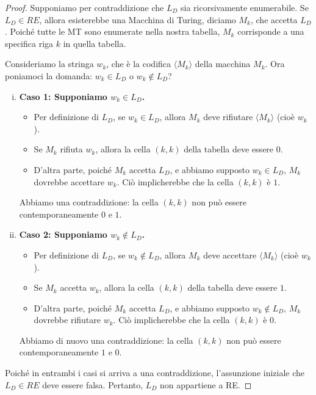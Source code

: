 \documentclass[a4paper, 11pt]{book} %
\theoremstyle{definition}
\begin{document}
\begin{proof}
Supponiamo per contraddizione che $L_D$ sia ricorsivamente enumerabile. Se $L_D \in RE$, allora esisterebbe una Macchina di Turing, diciamo $M_k$, che accetta $L_D$. Poiché tutte le MT sono enumerate nella nostra tabella, $M_k$ corrisponde a una specifica riga $k$ in quella tabella.

Consideriamo la stringa $w_k$, che è la codifica $\langle M_k \rangle$ della macchina $M_k$.
Ora poniamoci la domanda: $w_k \in L_D$ o $w_k \notin L_D$?

\begin{enumerate}[(i)]
    \item \textbf{Caso 1: Supponiamo $w_k \in L_D$.}
    \begin{itemize}
        \item Per definizione di $L_D$, se $w_k \in L_D$, allora $M_k$ deve rifiutare $\langle M_k \rangle$ (cioè $w_k$).
        \item Se $M_k$ rifiuta $w_k$, allora la cella $(k,k)$ della tabella deve essere $0$.
        \item D'altra parte, poiché $M_k$ accetta $L_D$, e abbiamo supposto $w_k \in L_D$, $M_k$ dovrebbe accettare $w_k$. Ciò implicherebbe che la cella $(k,k)$ è $1$.
    \end{itemize}
    Abbiamo una contraddizione: la cella $(k,k)$ non può essere contemporaneamente $0$ e $1$.

    \item \textbf{Caso 2: Supponiamo $w_k \notin L_D$.}
    \begin{itemize}
        \item Per definizione di $L_D$, se $w_k \notin L_D$, allora $M_k$ deve accettare $\langle M_k \rangle$ (cioè $w_k$).
        \item Se $M_k$ accetta $w_k$, allora la cella $(k,k)$ della tabella deve essere $1$.
        \item D'altra parte, poiché $M_k$ accetta $L_D$, e abbiamo supposto $w_k \notin L_D$, $M_k$ dovrebbe rifiutare $w_k$. Ciò implicherebbe che la cella $(k,k)$ è $0$.
    \end{itemize}
    Abbiamo di nuovo una contraddizione: la cella $(k,k)$ non può essere contemporaneamente $1$ e $0$.
\end{enumerate}
Poiché in entrambi i casi si arriva a una contraddizione, l'assunzione iniziale che $L_D \in RE$ deve essere falsa. Pertanto, $L_D$ non appartiene a RE.
\end{proof}
\end{document}
